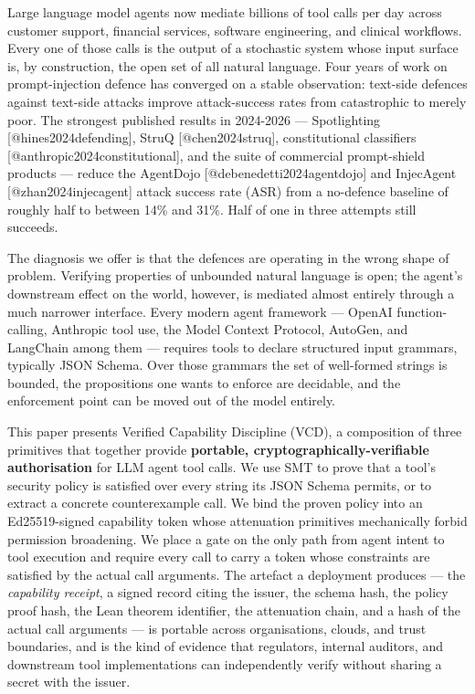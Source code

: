 Large language model agents now mediate billions of tool calls per day
across customer support, financial services, software engineering, and
clinical workflows. Every one of those calls is the output of a
stochastic system whose input surface is, by construction, the open set
of all natural language. Four years of work on prompt-injection defence
has converged on a stable observation: text-side defences against
text-side attacks improve attack-success rates from catastrophic to
merely poor. The strongest published results in 2024-2026 ---
Spotlighting {[}@hines2024defending{]}, StruQ {[}@chen2024struq{]},
constitutional classifiers {[}@anthropic2024constitutional{]}, and the
suite of commercial prompt-shield products --- reduce the AgentDojo
{[}@debenedetti2024agentdojo{]} and InjecAgent {[}@zhan2024injecagent{]}
attack success rate (ASR) from a no-defence baseline of roughly half to
between 14\% and 31\%. Half of one in three attempts still succeeds.

The diagnosis we offer is that the defences are operating in the wrong
shape of problem. Verifying properties of unbounded natural language is
open; the agent's downstream effect on the world, however, is mediated
almost entirely through a much narrower interface. Every modern agent
framework --- OpenAI function-calling, Anthropic tool use, the Model
Context Protocol, AutoGen, and LangChain among them --- requires tools
to declare structured input grammars, typically JSON Schema. Over those
grammars the set of well-formed strings is bounded, the propositions one
wants to enforce are decidable, and the enforcement point can be moved
out of the model entirely.

This paper presents Verified Capability Discipline (VCD), a composition
of three primitives that together provide \textbf{portable,
cryptographically-verifiable authorisation} for LLM agent tool calls. We
use SMT to prove that a tool's security policy is satisfied over every
string its JSON Schema permits, or to extract a concrete counterexample
call. We bind the proven policy into an Ed25519-signed capability token
whose attenuation primitives mechanically forbid permission broadening.
We place a gate on the only path from agent intent to tool execution and
require every call to carry a token whose constraints are satisfied by
the actual call arguments. The artefact a deployment produces --- the
\emph{capability receipt}, a signed record citing the issuer, the schema
hash, the policy proof hash, the Lean theorem identifier, the
attenuation chain, and a hash of the actual call arguments --- is
portable across organisations, clouds, and trust boundaries, and is the
kind of evidence that regulators, internal auditors, and downstream tool
implementations can independently verify without sharing a secret with
the issuer.

